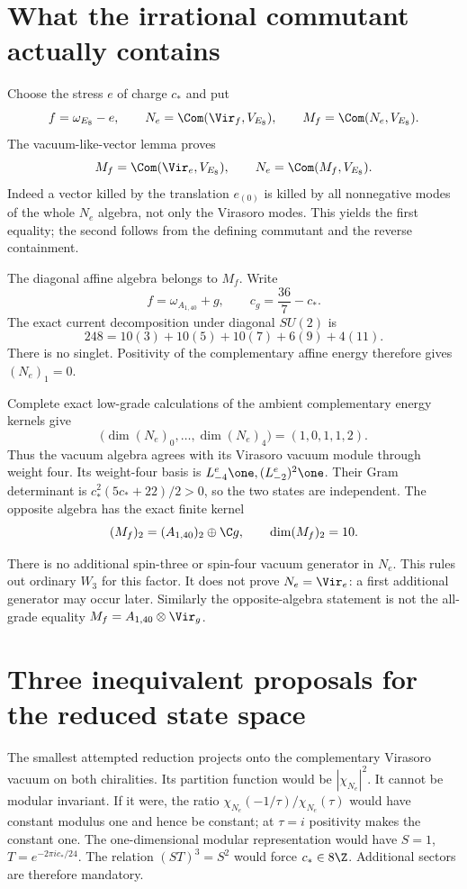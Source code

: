 \section{What the irrational commutant actually contains}

Choose the stress $e$ of charge $c_*$ and put
\[
 f=\omega_{E_8}-e,\qquad
 N_e=\Com(\Vir_f,V_{E_8}),\qquad
 M_f=\Com(N_e,V_{E_8}).
\]
The vacuum-like-vector lemma proves
\[
 M_f=\Com(\Vir_e,V_{E_8}),\qquad
 N_e=\Com(M_f,V_{E_8}).
\]
Indeed a vector killed by the translation $e_{(0)}$ is killed by
all nonnegative modes of the whole $N_e$ algebra, not only the
Virasoro modes. This yields the first equality; the second follows
from the defining commutant and the reverse containment.

The diagonal affine algebra belongs to $M_f$. Write
\[
 f=\omega_{A_{1,40}}+g,
 \qquad c_g=\frac{36}{7}-c_*.
\]
The exact current decomposition under diagonal $SU(2)$ is
\[
 248=10(3)+10(5)+10(7)+6(9)+4(11).
\]
There is no singlet. Positivity of the complementary affine energy
therefore gives $(N_e)_1=0$.

\begin{constructioninput}
Complete exact low-grade calculations of the ambient complementary
energy kernels give
\begin{equation}\label{eq:c-N-lowgrades}
 \bigl(\dim(N_e)_0,\ldots,\dim(N_e)_4\bigr)=(1,0,1,1,2).
\end{equation}
Thus the vacuum algebra agrees with its Virasoro vacuum module
through weight four. Its weight-four basis is
$L^e_{-4}\one,(L^e_{-2})^2\one$. Their Gram determinant is
$c_*^2(5c_*+22)/2>0$, so the two states are independent.
The opposite algebra has the exact finite kernel
\[
 (M_f)_2=(A_{1,40})_2\oplus\C g,
 \qquad\dim(M_f)_2=10.
\]
\end{constructioninput}
There is no additional spin-three or spin-four vacuum generator in
$N_e$. This rules out ordinary $W_3$ for this factor. It does not
prove $N_e=\Vir_e$: a first additional generator may occur later.
Similarly the opposite-algebra statement is not the all-grade equality
$M_f=A_{1,40}\otimes\Vir_g$.

\section{Three inequivalent proposals for the reduced state space}

The smallest attempted reduction projects onto the complementary
Virasoro vacuum on both chiralities. Its partition function would be
$|\chi_{N_e}|^2$. It cannot be modular invariant. If it were, the
ratio $\chi_{N_e}(-1/\tau)/\chi_{N_e}(\tau)$ would have constant
modulus one and hence be constant; at $\tau=i$ positivity makes the
constant one. The one-dimensional modular representation would have
$S=1$, $T=e^{-2\pi i c_*/24}$. The relation $(ST)^3=S^2$ would
force $c_*\in8\Z$. Additional sectors are therefore mandatory.

